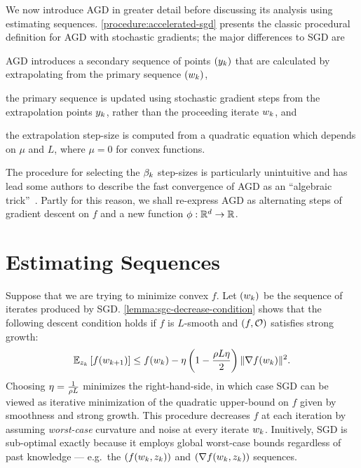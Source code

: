 We now introduce \ac{AGD} in greater detail before discussing its analysis using estimating sequences. 
\autoref{procedure:accelerated-sgd} presents the classic procedural definition for \ac{AGD} with stochastic gradients; the major differences to \ac{SGD} are
\begin{inparaenum}[i)]
\item \ac{AGD} introduces a secondary sequence of points \( \seq{\yk} \) that are calculated by extrapolating from the primary sequence \( \seq{\wk} \),
\item the primary sequence is updated using stochastic gradient steps from the extrapolation points \( \yk \), rather than the proceeding iterate \( \wk \), and 
\item the extrapolation step-size is computed from a quadratic equation which depends on \( \mu \) and \( L \), where \( \mu = 0 \) for convex functions. 
\end{inparaenum}
The procedure for selecting the \( \betak \) step-sizes is particularly unintuitive and has lead some authors to describe the fast convergence of \ac{AGD} as an ``algebraic trick''~\citep{allen2014linear}.
Partly for this reason, we shall re-express \ac{AGD} as alternating steps of gradient descent on \( f \) and a new function \( \phi : \R^d \rightarrow \R \).


\section{Estimating Sequences}\label{sec:estimating-sequences}


Suppose that we are trying to minimize convex \( f \).
Let \( \seq{\wk} \) be the sequence of iterates produced by \ac{SGD}.\@
\autoref{lemma:sgc-decrease-condition} shows that the following descent condition holds if \( f \) is \( L \)-smooth and \( \rbr{f, \oracle{}} \) satisfies strong growth:
\[ \Ek\sbr{f(\wkk)} \leq f(\wk) - \eta \rbr{1 - \frac{\sgc L \eta}{2}}\norm{\grad(\wk)}^2. \]
Choosing \( \eta = \frac{1}{\sgc L} \) minimizes the right-hand-side, in which case \ac{SGD} can be viewed as iterative minimization of the quadratic upper-bound on \( f \) given by smoothness and strong growth. 
This procedure decreases \( f \) at each iteration by assuming \emph{worst-case} curvature and noise at every iterate \( \wk \). 
Inuitively, \ac{SGD} is sub-optimal exactly because it employs global worst-case bounds regardless of past knowledge --- e.g.\ the \( \seq{f(\wk, \zk)} \) and \( \seq{\grad(\wk, \zk)} \) sequences. 

